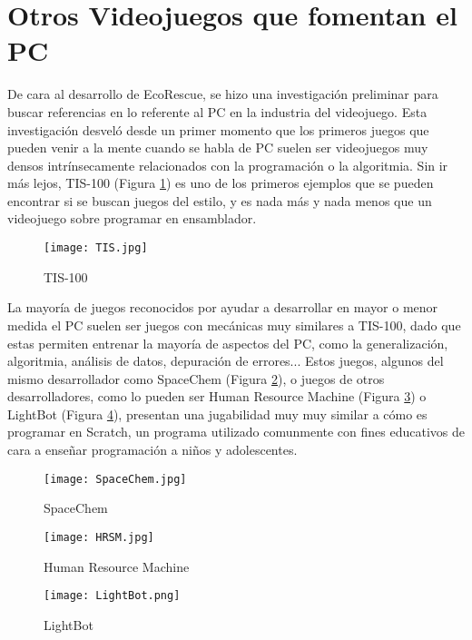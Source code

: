 \section{Otros Videojuegos que fomentan el PC}
De cara al desarrollo de EcoRescue, se hizo una investigación preliminar para buscar referencias en lo referente al PC en la industria del videojuego. Esta investigación desveló desde un primer momento que los primeros juegos que pueden venir a la mente cuando se habla de PC suelen ser videojuegos muy densos intrínsecamente relacionados con la programación o la algoritmia. Sin ir más lejos, TIS-100\cite{TIS-100} (Figura \ref{fig:tis100}) es uno de los primeros ejemplos que se pueden encontrar si se buscan juegos del estilo, y es nada más y nada menos que un videojuego sobre programar en ensamblador. 

\begin{figure}[H]
    \centering
      \texttt{[image: TIS.jpg]}
    \caption{TIS-100}
    \label{fig:tis100}
\end{figure}

La mayoría de juegos reconocidos por ayudar a desarrollar en mayor o menor medida el PC suelen ser juegos con mecánicas muy similares a TIS-100, dado que estas permiten entrenar la mayoría de aspectos del PC, como la generalización, algoritmia, análisis de datos, depuración de errores... Estos juegos, algunos del mismo desarrollador como SpaceChem\cite{SpaceChem} (Figura \ref{fig:spaceChem}), o juegos de otros desarrolladores, como lo pueden ser Human Resource Machine\cite{hrsm} (Figura \ref{fig:hsrm}) o LightBot\cite{lightbot} (Figura \ref{fig:lightbot}), presentan una jugabilidad muy muy similar a cómo es programar en Scratch\cite{Scratch}, un programa utilizado comunmente con fines educativos de cara a enseñar programación a niños y adolescentes.

\begin{figure}[H]
    \centering
      \texttt{[image: SpaceChem.jpg]}
    \caption{SpaceChem}
    \label{fig:spaceChem}
\end{figure}

\begin{figure}[H]
    \centering
      \texttt{[image: HRSM.jpg]}
    \caption{Human Resource Machine}
    \label{fig:hsrm}
\end{figure}

\begin{figure}[H]
    \centering
      \texttt{[image: LightBot.png]}
    \caption{LightBot}
    \label{fig:lightbot}
\end{figure}

